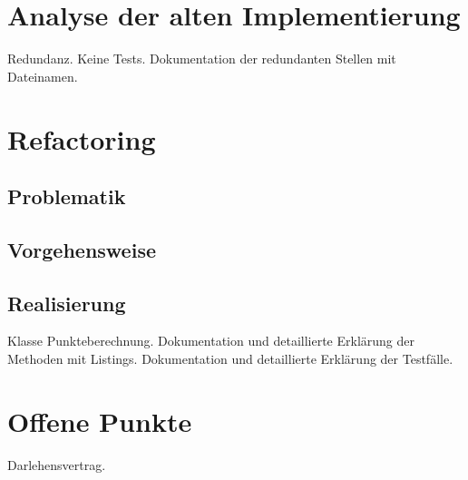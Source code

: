 \documentclass[12pt]{scrreprt}
\begin{document}
\newpage

\section{Analyse der alten Implementierung}
Redundanz. 
Keine Tests.
Dokumentation der redundanten Stellen mit Dateinamen.

\section{Refactoring}

\subsection{Problematik}

\subsection{Vorgehensweise}

\subsection{Realisierung}
Klasse Punkteberechnung.
Dokumentation und detaillierte Erklärung der Methoden mit Listings.
Dokumentation und detaillierte Erklärung der Testfälle.

\section{Offene Punkte}
Darlehensvertrag.
\end{document}

